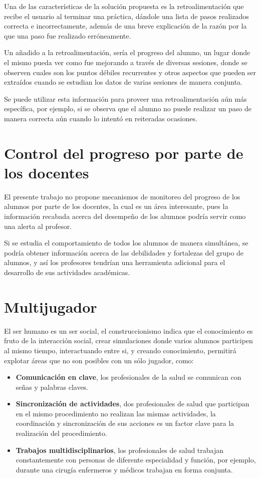 Una de las características de la solución propuesta es la retroalimentación que recibe
el usuario al terminar una práctica, dándole una lista de pasos realizados correcta 
e incorrectamente, además de una breve explicación de la razón por la que una paso 
fue realizado erróneamente.

Un añadido a la retroalimentación, sería el progreso del alumno, un lugar donde el
mismo pueda ver como fue mejorando a través de diversas sesiones, donde se
observen cuales son los puntos débiles recurrentes y otros aspectos que pueden
ser extraídos cuando se estudian los datos de varias sesiones de manera conjunta. 

Se puede utilizar esta información para proveer una retroalimentación aún más
específica, por ejemplo, si se observa que el alumno no puede realizar un
paso de manera correcta aún cuando lo intentó en reiteradas ocasiones.

\section{Control del progreso por parte de los docentes}

El presente trabajo no propone mecanismos de monitoreo del progreso de los alumnos 
por parte de los docentes, la cual es un área interesante, pues la información recabada acerca 
del desempeño de los alumnos podría servir como una alerta al profesor.

Si se estudia el comportamiento de todos los alumnos de manera simultánea, se
podría obtener información acerca de las debilidades y fortalezas del grupo de
alumnos, y así los profesores tendrían una herramienta adicional para el
desarrollo de sus actividades académicas.

\section{Multijugador}

El ser humano es un ser social, el construccionismo indica que el conocimiento
es fruto de la interacción social, crear simulaciones donde varios alumnos
participen al mismo tiempo, interactuando entre si, y creando conocimiento,
permitirá explotar áreas que no son posibles con un sólo jugador, como:

\begin{itemize}
    \item \textbf{Comunicación en clave}, los profesionales de la salud se comunican con
        señas y palabras claves.
    \item \textbf{Sincronización de actividades}, dos profesionales de salud que
        participan en el mismo procedimiento no realizan las mismas actividades,
        la coordinación y sincronización de sus acciones es un factor clave para
        la realización del procedimiento.
    \item \textbf{Trabajos multidisciplinarios}, los profesionales de salud trabajan
        constantemente con personas de diferente especialidad y función, por
        ejemplo, durante una cirugía enfermeros y médicos trabajan en forma
        conjunta.
\end{itemize}

